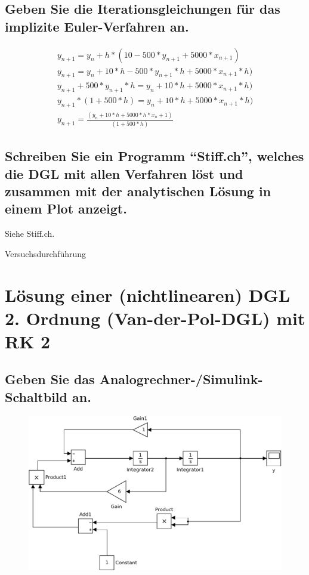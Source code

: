 \documentclass[10pt,a4paper]{article}
\begin{document}
\subsection{Geben Sie die Iterationsgleichungen für das implizite Euler-Verfahren an.}
\begin{subequations}
\begin{align}
y_{n+1} = y_n + h * (10 - 500 * y_{n+1} + 5000 * x_{n+1})\\
y_{n+1} = y_n + 10 * h - 500 * y_{n+1} * h + 5000 * x_{n+1} * h)\\
y_{n+1} + 500 * y_{n+1} * h = y_n + 10 * h + 5000 * x_{n+1} * h)\\
y_{n+1} * (1+ 500 * h) = y_n + 10 * h + 5000 * x_{n+1} * h)\\
y_{n+1} = \frac{(y_n + 10 * h + 5000 * h * x_n+1)}{ (1+500*h)}
\end{align}
\end{subequations}

\subsection{Schreiben Sie ein Programm "`Stiff.ch"', welches die DGL mit allen Verfahren
löst und zusammen mit der analytischen Lösung in einem Plot anzeigt.}

Siehe Stiff.ch.

\begin{center}
\begin{large}
Versuchsdurchführung
\end{large}
\end{center}


\section{Lösung einer (nichtlinearen) DGL 2. Ordnung (Van-der-Pol-DGL) mit RK 2}
\subsection{Geben Sie das Analogrechner-/Simulink-Schaltbild an.}
\begin{figure}[h]
\centering
\includegraphics[width=0.9\linewidth]{../screenshots/2}
\end{figure}
\end{document}
